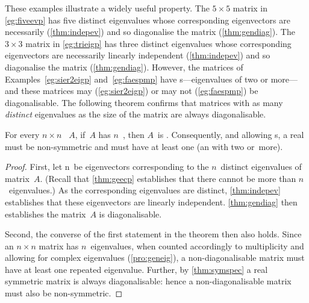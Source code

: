 These examples illustrate a widely useful property.
The \(5\times 5\) matrix in \autoref{eg:fiveevp} has five distinct eigenvalues whose corresponding eigenvectors are necessarily  (\autoref{thm:indepev}) and so diagonalise the matrix (\autoref{thm:gendiag}).
The \(3\times 3\) matrix in \autoref{eg:trieigp} has three distinct eigenvalues whose corresponding eigenvectors are necessarily linearly independent (\autoref{thm:indepev}) and so diagonalise the matrix (\autoref{thm:gendiag}).
However, the matrices of Examples~\ref{eg:sier2eigp} and~\ref{eg:faespmp} have s---eigenvalues of  two or more---and these matrices may (\autoref{eg:sier2eigp}) or may not (\autoref{eg:faespmp}) be diagonalisable.
The following theorem confirms that matrices with as many \emph{distinct} eigenvalues as the size of the matrix are always diagonalisable.






\begin{theorem} \label{thm:dlamd} 
For every \(n\times n\) ~\(A\), if~\(A\) has \(n\)~, then \(A\)~is .
Consequently, and allowing s, a real  must be non-symmetric and must have at least one  (an  with  two or~more).
\end{theorem}
\begin{proof}  
First, let \hlist\vv n\ be eigenvectors corresponding to the \(n\)~distinct eigenvalues of matrix~\(A\).
(Recall that \autoref{thm:geecp} establishes that there cannot be more than \(n\)~eigenvalues.)
As the corresponding eigenvalues are distinct, \autoref{thm:indepev} establishes that these eigenvectors are linearly independent.
\autoref{thm:gendiag} then establishes the matrix~\(A\) is diagonalisable.

Second, the converse of the first statement in the theorem then also holds.
Since an \(n\times n\) matrix has \(n\)~eigenvalues, when counted accordingly to multiplicity and allowing for complex eigenvalues (\autoref{pro:geneig}), a non-diagonalisable matrix must have at least one repeated eigenvalue.  
Further, by \autoref{thm:symspec} a real symmetric matrix is always diagonalisable: hence a non-diagonalisable matrix must also be non-symmetric.
\end{proof}


